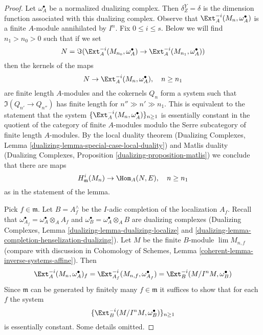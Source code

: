 \begin{proof}
Let $\omega_A^\bullet$ be a normalized dualizing complex. Then
$\delta^Y_Z = \delta$ is the dimension function associated with
this dualizing complex.
Observe that $\Ext^{-i}_A(M_n, \omega_A^\bullet)$ is a finite $A$-module
annihilated by $I^n$. Fix $0 \leq i \leq s$.
Below we will find $n_1 > n_0 > 0$ such that if we set
$$
N = \Im(\Ext^{-i}_A(M_{n_0}, \omega_A^\bullet) \to
\Ext^{-i}_A(M_{n_1}, \omega_A^\bullet))
$$
then the kernels of the maps
$$
N \to \Ext^{-i}_A(M_n, \omega_A^\bullet),\quad n \geq n_1
$$
are finite length $A$-modules and the cokernels $Q_n$ form a
system such that $\Im(Q_{n'} \to Q_{n''})$ has finite length
for $n'' \gg n' \gg n_1$. This is equivalent to the statement that
the system $\{\Ext^{-i}_A(M_n, \omega_A^\bullet)\}_{n \geq 1}$
is essentially constant in the quotient of the category of finite
$A$-modules modulo the Serre subcategory of finite length $A$-modules.
By the local duality theorem
(Dualizing Complexes, Lemma \ref{dualizing-lemma-special-case-local-duality})
and Matlis duality
(Dualizing Complexes, Proposition \ref{dualizing-proposition-matlis})
we conclude that there are maps
$$
H^i_\mathfrak m(M_n) \to \Hom_A(N, E),\quad n \geq n_1
$$
as in the statement of the lemma.

\medskip\noindent
Pick $f \in \mathfrak m$. Let $B = A_f^\wedge$ be the $I$-adic completion
of the localization $A_f$. Recall that
$\omega_{A_f}^\bullet = \omega_A^\bullet \otimes_A A_f$
and $\omega_B^\bullet = \omega_A^\bullet \otimes_A B$ are dualizing
complexes (Dualizing Complexes, Lemma \ref{dualizing-lemma-dualizing-localize}
and \ref{dualizing-lemma-completion-henselization-dualizing}).
Let $M$ be the finite $B$-module $\lim M_{n, f}$ (compare with
discussion in Cohomology of Schemes, Lemma
\ref{coherent-lemma-inverse-systems-affine}). Then
$$
\Ext^{-i}_A(M_n, \omega_A^\bullet)_f =
\Ext^{-i}_{A_f}(M_{n, f}, \omega_{A_f}^\bullet) =
\Ext^{-i}_B(M/I^n M, \omega_B^\bullet)
$$
Since $\mathfrak m$ can be generated by finitely many $f \in \mathfrak m$
it suffices to show that for each $f$ the system
$$
\{\Ext^{-i}_B(M/I^n M, \omega_B^\bullet)\}_{n \geq 1}
$$
is essentially constant. Some details omitted.


\end{proof}
